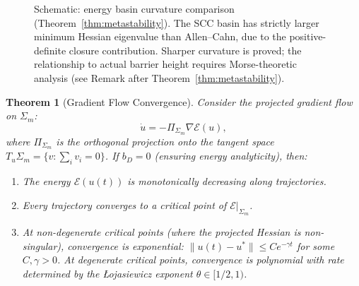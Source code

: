 \documentclass[lettersize,journal]{IEEEtran}
\newtheorem{theorem}{Theorem}
\begin{document}
\begin{figure}[!t]
\centering
{}
\caption{Schematic: energy basin curvature comparison (Theorem~\ref{thm:metastability}). The SCC basin has strictly larger minimum Hessian eigenvalue than Allen--Cahn, due to the positive-definite closure contribution. Sharper curvature is proved; the relationship to actual barrier height requires Morse-theoretic analysis (see Remark after Theorem~\ref{thm:metastability}).}
\label{fig:basin}
\end{figure}

\begin{theorem}[Gradient Flow Convergence]
\label{thm:gradient-flow}
Consider the projected gradient flow on $\Sigma_m$:
\begin{equation}
\dot{u} = -\Pi_{\Sigma_m} \nabla\mathcal{E}(u),
\end{equation}
where $\Pi_{\Sigma_m}$ is the orthogonal projection onto the tangent space $T_u\Sigma_m = \{v : \sum_i v_i = 0\}$. If $b_D = 0$ (ensuring energy analyticity), then:
\begin{enumerate}
\item[(a)] The energy $\mathcal{E}(u(t))$ is monotonically decreasing along trajectories.
\item[(b)] Every trajectory converges to a critical point of $\mathcal{E}|_{\Sigma_m}$.
\item[(c)] At non-degenerate critical points (where the projected Hessian is non-singular), convergence is exponential: $\|u(t) - u^*\| \leq Ce^{-\gamma t}$ for some $C, \gamma > 0$. At degenerate critical points, convergence is polynomial with rate determined by the \L{}ojasiewicz exponent $\theta \in [1/2, 1)$.
\end{enumerate}
\end{theorem}
\end{document}
